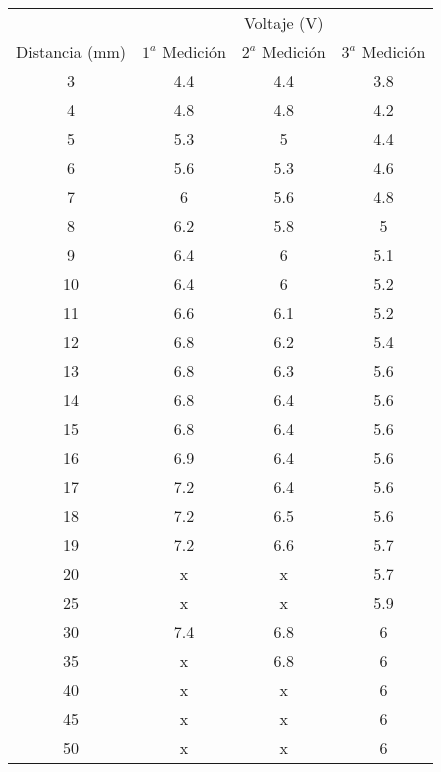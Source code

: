 \begin{tabular}{| c | c | c | c |}
\hline
 & \multicolumn{3}{|c|}{Voltaje (V)} \\ \cline{2-4}
Distancia (mm)	& $1^a$ Medición	&$2^a$ Medición	& $3^a$ Medición\\ \hline
3	&4.4	&4.4	&3.8\\
4	&4.8	&4.8	& 4.2\\
5	&5.3	&5	    &4.4\\
6	&5.6	&5.3	&4.6\\
7	&6	    &5.6	&4.8\\
8	&6.2	&5.8	&5\\
9	&6.4	&6	    &5.1\\
10	&6.4	&6	    &5.2\\
11	&6.6	&6.1	&5.2\\
12	&6.8	&6.2	&5.4\\
13	&6.8	&6.3	&5.6\\
14	&6.8	&6.4	&5.6\\
15	&6.8	&6.4	&5.6\\
16	&6.9	&6.4	&5.6\\
17	&7.2	&6.4	&5.6\\
18	&7.2	&6.5	&5.6\\
19	&7.2	&6.6	&5.7\\
20	&x	    &x	    &5.7\\
25	&x	    &x	    &5.9\\
30	&7.4	&6.8	&6\\
35	&x	    &6.8	&6\\
40	&x	    &x	    &6\\
45	&x	    &x	    &6\\
50	&x	    &x	    &6\\ \hline
\end{tabular}